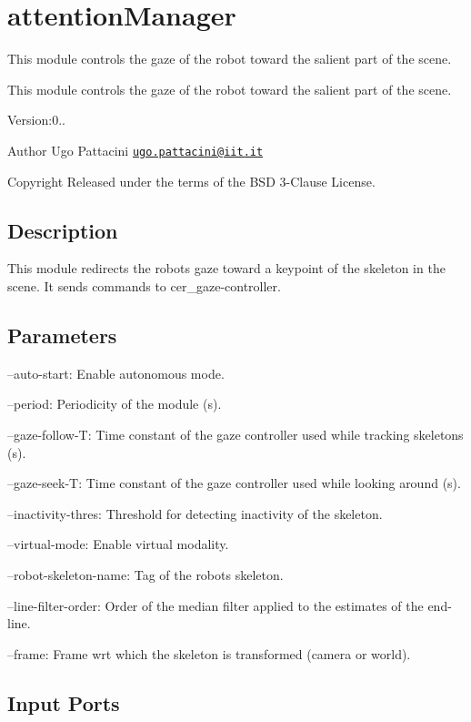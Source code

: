 \section{attention\+Manager}
\label{group__attentionManager}


This module controls the gaze of the robot toward the salient part of the scene.  


This module controls the gaze of the robot toward the salient part of the scene. 

Version\+:0.. \begin{DoxyAuthor}{Author}
Ugo Pattacini \href{mailto:ugo.pattacini@iit.it}{\tt ugo.\+pattacini@iit.\+it} ~\newline
 
\end{DoxyAuthor}
\begin{DoxyCopyright}{Copyright}
Released under the terms of the B\+SD 3-\/\+Clause License. 
\end{DoxyCopyright}
\hypertarget{group__skeletonViewer_intro_sec}{}\subsection{Description}\label{group__skeletonViewer_intro_sec}
This module redirects the robot\textquotesingle{}s gaze toward a keypoint of the skeleton in the scene. It sends commands to cer\+\_\+gaze-\/controller.\hypertarget{group__skeletonViewer_parameters_sec}{}\subsection{Parameters}\label{group__skeletonViewer_parameters_sec}

\begin{DoxyItemize}
\item --auto-\/start\+: Enable autonomous mode.
\item --period\+: Periodicity of the module (s).
\item --gaze-\/follow-\/T\+: Time constant of the gaze controller used while tracking skeletons (s).
\item --gaze-\/seek-\/T\+: Time constant of the gaze controller used while looking around (s).
\item --inactivity-\/thres\+: Threshold for detecting inactivity of the skeleton.
\item --virtual-\/mode\+: Enable virtual modality.
\item --robot-\/skeleton-\/name\+: Tag of the robot\textquotesingle{}s skeleton.
\item --line-\/filter-\/order\+: Order of the median filter applied to the estimates of the end-\/line.
\item --frame\+: Frame wrt which the skeleton is transformed (camera or world). 
\end{DoxyItemize}\hypertarget{group__skeletonViewer_inputports_sec}{}\subsection{Input Ports}\label{group__skeletonViewer_inputports_sec}

